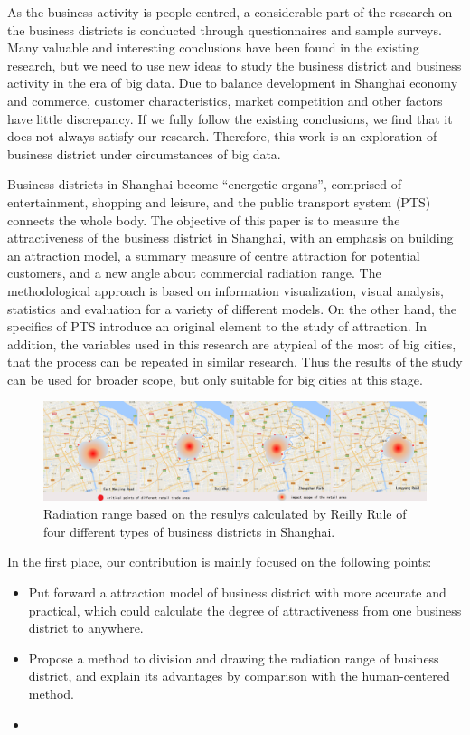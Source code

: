 \documentclass[journal]{IEEEtran}
\begin{document}
As the business activity is people-centred, a considerable part of the research on the business districts is conducted through questionnaires and sample surveys. Many valuable and interesting conclusions have been found in the existing research, but we need to use new ideas to study the business district and business activity in the era of big data. Due to balance development in Shanghai economy and commerce, customer characteristics, market competition and other factors have little discrepancy. If we fully follow the existing conclusions, we find that it does not always satisfy our research. Therefore, this work is an exploration of business district under circumstances of big data.

Business districts in Shanghai become ``energetic organs'', comprised of entertainment, shopping and leisure, and the public transport system (PTS) connects the whole body. The objective of this paper is to measure the attractiveness of the business district in Shanghai, with an emphasis on building an attraction model, a summary measure of centre attraction for potential customers, and a new angle about commercial radiation range. The methodological approach is based on information visualization, visual analysis, statistics and evaluation for a variety of different models. On the other hand, the specifics of PTS introduce an original element to the study of attraction. In addition, the variables used in this research are atypical of the most of big cities, that the process can be repeated in similar research. Thus the results of the study can be used for broader scope, but only suitable for big cities at this stage.

\begin{figure}[tb]
\centering
\includegraphics[width=1.9\columnwidth]{figure1.png}
\caption{Radiation range based on the resulys calculated by Reilly Rule of four different types of business districts in Shanghai.}
\label{fig:Reilly-range}
\end{figure}

In the first place, our contribution is mainly focused on the following points:

\begin{itemize}
\item Put forward a attraction model of business district with more accurate and practical, which could calculate the degree of attractiveness from one business district to anywhere.
\item Propose a method to division and drawing the radiation range of business district, and explain its advantages by comparison with the human-centered method.
\item 
\end{itemize}
\end{document}
